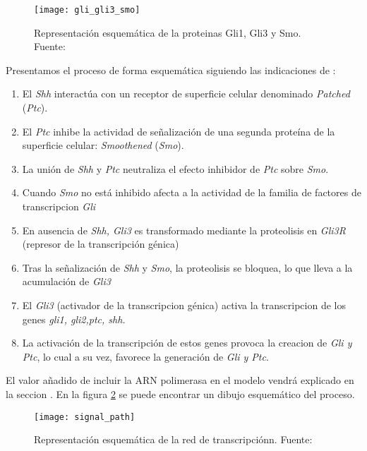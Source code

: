  \begin{figure}[h]
 	\texttt{[image: gli\_gli3\_smo]}
 	\centering
 	\caption{Representación esquemática de la proteinas Gli1, Gli3 y Smo. Fuente: \cite{phosphosite}}
 	\label{figuras}
 \end{figure}
 
 
 
 
 Presentamos el proceso de forma esquemática siguiendo las  indicaciones de \cite{schaffer}:
 \begin{enumerate}
 	\item El \textit{Shh} interactúa con un receptor de superficie celular denominado \textit{Patched }(\textit{Ptc}).
 	\item El \textit{Ptc} inhibe la actividad de señalización de una segunda proteína de la superficie celular: \textit{Smoothened }(\textit{Smo}).
 	\item La unión de \textit{Shh} y \textit{Ptc} neutraliza el efecto inhibidor  de \textit{Ptc} sobre \textit{Smo}.
 	\item Cuando \textit{Smo} no está inhibido afecta a la actividad de la familia de factores de transcripcion \textit{Gli}
 	\item En ausencia de\textit{ Shh, Gli3} es transformado mediante la proteolisis en \textit{Gli3R} (represor de la transcripción génica)
 	\item Tras la señalización de \textit{Shh} y \textit{Smo}, la proteolisis se bloquea, lo que lleva a la acumulación de \textit{Gli3}
 	\item El \textit{Gli3} (activador de la transcripcion génica) activa la transcripcion de los genes \textit{gli1, gli2,ptc, shh.}
 	\item La activación de la transcripción de estos genes provoca la creacion de\textit{ Gli y Ptc}, lo cual a su vez, favorece la generación de \textit{Gli y Ptc}.
 \end{enumerate}
 
 El valor añadido de incluir la ARN polimerasa en el modelo vendrá explicado en la seccion \cite{waseel} .
 En la figura \ref{signal_path} se puede encontrar un dibujo esquemático del proceso.
  \begin{figure}[h]
  	\texttt{[image: signal\_path]}
  	\centering
  	\caption{Representación esquemática de la red de transcripciónn. Fuente: \cite{schaffer}}
  	\label{signal_path}
  \end{figure}
  
 
 
